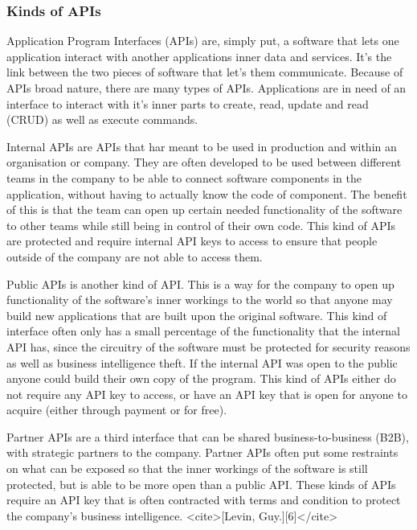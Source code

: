 \documentclass[11pt]{article}
\begin{document}
\begin{multicols}{2}
        \subsubsection{Kinds of APIs}

        Application Program Interfaces (APIs) are, simply put, a software that
        lets one application interact with another applications inner data and
        services. It's the link between the two pieces of software that let's
        them communicate. Because of APIs broad nature, there are many types of
        APIs. Applications are in need of an interface to interact with it's
        inner parts to create, read, update and read (CRUD) as well as execute
        commands.


        Internal APIs are APIs that har meant to be used in production and
        within an organisation or company. They are often developed to be used
        between different teams in the company to be able to connect software
        components in the application, without having to actually know the code
        of component. The benefit of this is that the team can open up certain
        needed functionality of the software to other teams while still being in
        control of their own code. This kind of APIs are protected and require
        internal API keys to access to ensure that people outside of the company
        are not able to access them.

        Public APIs is another kind of API. This is a way for the company to
        open up functionality of the software's inner workings to the world so
        that anyone may build new applications that are built upon the original
        software. This kind of interface often only has a small percentage of
        the functionality that the internal API has, since the circuitry of the
        software must be protected for security reasons as well as business
        intelligence theft. If the internal API was open to the public anyone
        could build their own copy of the program. This kind of APIs either do
        not require any API key to access, or have an API key that is open for
        anyone to acquire (either through payment or for free).

        Partner APIs are a third interface that can be shared
        business-to-business (B2B), with strategic partners to the company.
        Partner APIs often put some restraints on what can be exposed so that
        the inner workings of the software is still protected, but is able to be
        more open than a public API. These kinds of APIs require an API key that
        is often contracted with terms and condition to protect the company's
        business intelligence. <cite>[Levin, Guy.][6]</cite>


\end{multicols}
\end{document}
